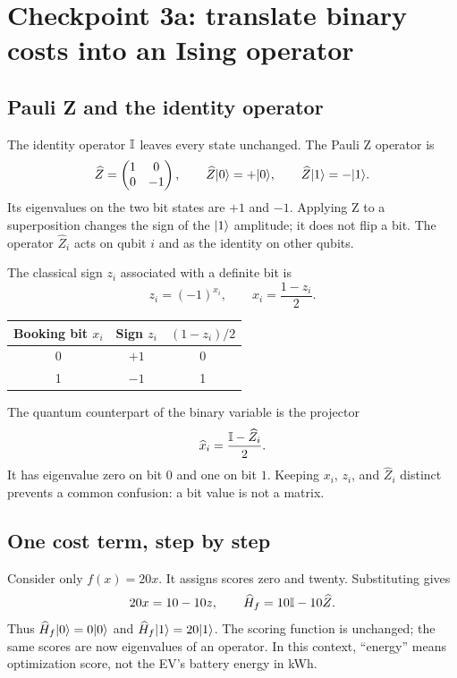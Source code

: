 \section{Checkpoint 3a: translate binary costs into an Ising operator}\label{sec:ising}
\subsection{Pauli Z and the identity operator}
The identity operator $\mathbb{I}$ leaves every state unchanged. The Pauli Z operator is
\begin{equation}
\widehat Z=\begin{pmatrix}1&0\\0&-1\end{pmatrix},\qquad
\widehat Z\lvert 0\rangle=+\lvert 0\rangle,\qquad \widehat Z\lvert 1\rangle=-\lvert 1\rangle.
\end{equation}
Its eigenvalues on the two bit states are $+1$ and $-1$. Applying Z to a
superposition changes the sign of the $\lvert 1\rangle$ amplitude; it does not flip a bit.
The operator $\widehat Z_i$ acts on qubit $i$ and as the identity on other qubits.

The classical sign $z_i$ associated with a definite bit is
\begin{equation}
z_i=(-1)^{x_i},\qquad x_i=\frac{1-z_i}{2}.
\end{equation}
\begin{center}
\begin{tabular}{ccc}
\toprule
Booking bit $x_i$ & Sign $z_i$ & $(1-z_i)/2$\\
\midrule
0 & $+1$ & 0\\
1 & $-1$ & 1\\
\bottomrule
\end{tabular}
\end{center}
The quantum counterpart of the binary variable is the projector
\begin{equation}\label{eq:projector}
\widehat x_i=\frac{\mathbb{I}-\widehat Z_i}{2}.
\end{equation}
It has eigenvalue zero on bit $0$ and one on bit $1$. Keeping $x_i$, $z_i$, and
$\widehat Z_i$ distinct prevents a common confusion: a bit value is not a matrix.

\subsection{One cost term, step by step}
Consider only $f(x)=20x$. It assigns scores zero and twenty. Substituting gives
\begin{equation}
20x=10-10z,\qquad \widehat H_f=10\mathbb{I}-10\widehat Z.
\end{equation}
Thus $\widehat H_f\lvert 0\rangle=0\lvert 0\rangle$ and $\widehat H_f\lvert 1\rangle=20\lvert 1\rangle$. The scoring function is
unchanged; the same scores are now eigenvalues of an operator. In this context,
``energy'' means optimization score, not the EV's battery energy in kWh.

